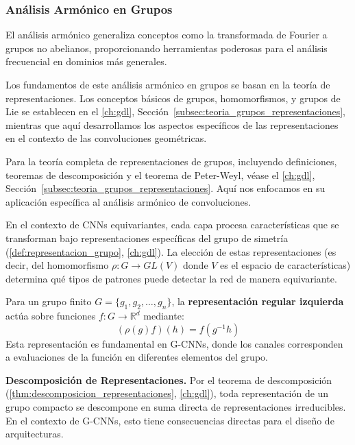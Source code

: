 \subsubsection{Análisis Armónico en Grupos}

El análisis armónico generaliza conceptos como la transformada de Fourier a grupos no abelianos, proporcionando herramientas poderosas para el análisis frecuencial en dominios más generales.

Los fundamentos de este análisis armónico en grupos se basan en la teoría de representaciones. Los conceptos básicos de grupos, homomorfismos, y grupos de Lie se establecen en el \autoref{ch:gdl}, Sección~\ref{subsec:teoria_grupos_representaciones}, mientras que aquí desarrollamos los aspectos específicos de las representaciones en el contexto de las convoluciones geométricas.

Para la teoría completa de representaciones de grupos, incluyendo definiciones, teoremas de descomposición y el teorema de Peter-Weyl, véase el \autoref{ch:gdl}, Sección~\ref{subsec:teoria_grupos_representaciones}. Aquí nos enfocamos en su aplicación específica al análisis armónico de convoluciones.

En el contexto de \glspl{CNN} equivariantes, cada capa procesa características que se transforman bajo representaciones específicas del grupo de simetría (\autoref{def:representacion_grupo}, \autoref{ch:gdl}). La elección de estas representaciones (es decir, del homomorfismo $\rho: G \to GL(V)$ donde $V$ es el espacio de características) determina qué tipos de patrones puede detectar la red de manera equivariante.

\begin{example}\label{ex:representacion_regular_cnn}
Para un grupo finito $G = \{g_1, g_2, \ldots, g_n\}$, la \textbf{representación regular izquierda} actúa sobre funciones $f: G \rightarrow \mathbb{R}^d$ mediante:
\begin{equation}
(\rho(g)f)(h) = f(g^{-1}h)
\end{equation}
Esta representación es fundamental en G-\glspl{CNN}, donde los canales corresponden a evaluaciones de la función en diferentes elementos del grupo.
\end{example}

\textbf{Descomposición de Representaciones.} Por el teorema de descomposición (\autoref{thm:descomposicion_representaciones}, \autoref{ch:gdl}), toda representación de un grupo compacto se descompone en suma directa de representaciones irreducibles. En el contexto de G-\glspl{CNN}, esto tiene consecuencias directas para el diseño de arquitecturas.

